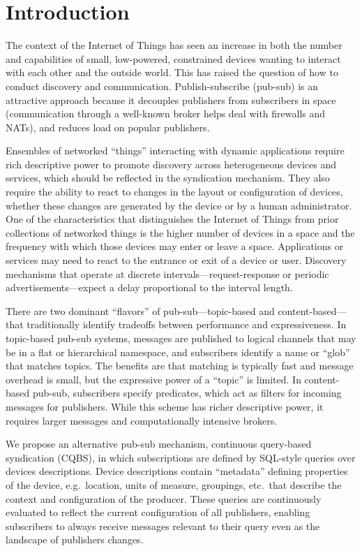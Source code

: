 \section{Introduction}

The context of the Internet of Things has seen an increase in both the number and capabilities of small, low-powered, constrained devices wanting to interact with each other and the outside world.
This has raised the question of how to conduct discovery and communication.
Publish-subscribe (pub-sub) is an attractive approach because it decouples publishers from subscribers in space (communication through a well-known broker helps deal with firewalls and NATs), and reduces load on popular publishers.

Ensembles of networked ``things'' interacting with dynamic applications require rich descriptive power to promote discovery across heterogeneous devices and services, which should be reflected in the syndication mechanism. They also require the ability to react to changes in the layout or configuration of devices, whether these changes are generated by the device or by a human administrator.
One of the characteristics that distinguishes the Internet of Things from prior collections of networked things is the higher number of devices in a space and the frequency with which those devices may enter or leave a space.
Applications or services may need to react to the entrance or exit of a device or user.
Discovery mechanisms that operate at discrete intervals---request-response or periodic advertisements---expect a delay proportional to the interval length.

There are two dominant ``flavors'' of pub-sub---topic-based and content-based---that traditionally identify tradeoffs between performance and expressiveness.
In topic-based pub-sub systems, messages are published to logical channels that may be in a flat or hierarchical namespace, and subscribers identify a name or ``glob'' that matches topics.
The benefits are that matching is typically fast and message overhead is small, but the expressive power of a ``topic'' is limited.
In content-based pub-sub, subscribers specify predicates, which act as filters for incoming messages for publishers.
While this scheme has richer descriptive power, it requires larger messages and computationally intensive brokers.

We propose an alternative pub-sub mechanism, continuous query-based syndication (CQBS), in which subscriptions are defined by SQL-style queries over devices descriptions.
Device descriptions contain ``metadata'' defining properties of the device, e.g.\ location, units of measure, groupings, etc.\ that describe the context and configuration of the producer.
These queries are continuously evaluated to reflect the current configuration of all publishers, enabling subscribers to always receive messages relevant to their query even as the landscape of
publishers changes.

